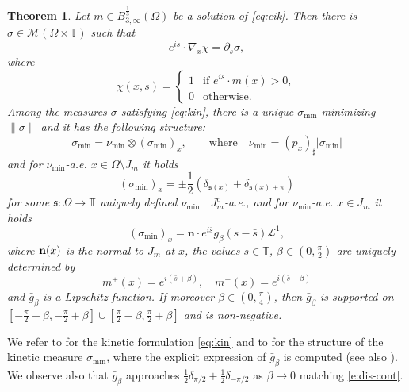 \documentclass[fleqn
]{article}
\numberwithin{equation}{section}
\newcommand{\T}{{\mathbb T}}
\renewcommand{\L}{{\mathcal L}}
\newtheorem{thm}{Theorem}[section]
\theoremstyle{definition}
\begin{document}
\begin{thm}\label{t:kin}
Let $m \in B^{\frac13}_{3,\infty}(\Omega)$ be a solution of \eqref{eq:eik}. Then there is $\sigma \in \mathcal M(\Omega \times \T)$ such that 
\begin{equation}\label{eq:kin}
e^{is}\cdot \nabla_x \chi = \partial_s \sigma,
\end{equation}
where 
\[
\chi(x,s)= 
\begin{cases}
1 & \mbox{if }e^{is}\cdot m(x)>0 , \\
0 & \mbox{otherwise}.
\end{cases}
\]
Among the measures $\sigma$ satisfying \eqref{eq:kin}, there is a unique $\sigma_{\min}$ minimizing $\|\sigma\|$ and it has the following structure: 
\[
\sigma_{\min} = \nu_{\min} \otimes (\sigma_{\min})_x, \qquad \mbox{where} \quad \nu_{\min}= (p_x)_\sharp |\sigma_{\min}|
\]
and for $\nu_{\min}$-a.e. $x \in \Omega \setminus J_m$ it holds
\begin{equation}\label{e:dis-cont}
(\sigma_{\min})_x = \pm \frac12 \left( \delta_{\mathfrak s(x)}+ \delta_{\mathfrak s(x)+ \pi}\right)
\end{equation}
for some $\mathfrak s: \Omega \to \T$ uniquely defined $\nu_{\min}\llcorner J_m^c$-a.e., and for $\nu_{\min}$-a.e. $x \in J_m$ it holds
\[
(\sigma_{\min})_x = \mathbf{n}\cdot e^{i\bar s} \bar g_\beta(s-\bar s)\L^1,
\]
where ${\bf n}(x)$ is the normal to $J_m$ at $x$, the values $ \bar s\in \T$, $\beta \in (0,\frac{\pi}2)$ are uniquely determined by 
\[
m^+(x)= e^{i(\bar s + \beta)}, \quad m^-(x)= e^{i(\bar s - \beta)}
\]
and $\bar g_\beta$ is a Lipschitz function.
If moreover $\beta \in (0,\frac\pi4)$, then $\bar g_\beta$ is supported on $[ - \frac\pi2 - \beta, - \frac\pi2 + \beta] \cup [ \frac\pi2 - \beta, \frac\pi2 + \beta]$ and is non-negative.
\end{thm}
We refer to \cite{GL20} for the kinetic formulation \eqref{eq:kin} and to \cite{marconi21ellipse} for the structure of the kinetic measure $\sigma_{\min}$, where the explicit expression of $\bar g_\beta$ is computed (see also \cite{LP23facto}).
We observe also that $\bar g_\beta$ approaches $\frac12\delta_{\pi/2}+ \frac12\delta_{-\pi/2}$ as $\beta \to 0$ matching \eqref{e:dis-cont}.
\end{document}
